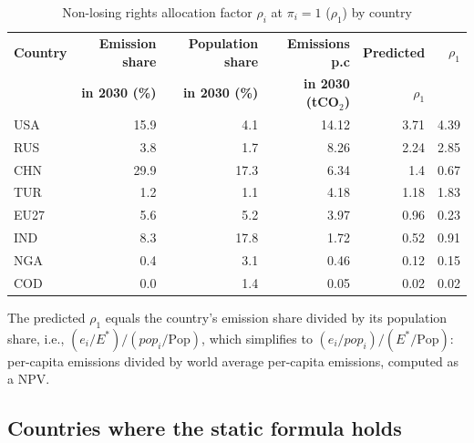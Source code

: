 \documentclass[12pt,english]{article}
\begin{document}
\begin{table}[h]
\centering
\small
\begin{threeparttable}
\caption{Non-losing rights allocation factor $\rho_i$ at $\pi_i = 1$ ($\rho_1$) by country}
\renewcommand{\arraystretch}{1.2}
\begin{tabular}{lrrrrr}
  \toprule
  \textbf{Country} & \textbf{Emission share} & \textbf{Population share} & \textbf{Emissions p.c} & \textbf{Predicted} & $\rho_1$ \\
  & \textbf{in 2030 (\%)} & \textbf{in 2030 (\%)} & \textbf{in 2030 (tCO$_2$)} & \textbf{$\rho_1$}\tnote{a} & \\
  \midrule
  USA & 15.9 & 4.1 & 14.12 & 3.71 & 4.39 \\
  RUS & 3.8 & 1.7 & 8.26 & 2.24 & 2.85 \\
  CHN & 29.9 & 17.3 & 6.34 & 1.4 & 0.67 \\
  TUR & 1.2 & 1.1 & 4.18 & 1.18 & 1.83 \\
  EU27 & 5.6 & 5.2 & 3.97 & 0.96 & 0.23 \\
  IND & 8.3 & 17.8 & 1.72 & 0.52 & 0.91 \\
  NGA & 0.4 & 3.1 & 0.46 & 0.12 & 0.15 \\
  COD & 0.0 & 1.4 & 0.05 & 0.02 & 0.02 \\
  \bottomrule
\end{tabular}
\begin{tablenotes}\footnotesize
  \item[a] The predicted $\rho_1$ equals the country's emission share divided by its population share, i.e., $(e_i/E^*) / (pop_i/\text{Pop})$, which simplifies to $(e_i/pop_i) / (E^*/\text{Pop})$: per-capita emissions divided by world average per-capita emissions, computed as a NPV.
\end{tablenotes}
\label{tab:summary}
\end{threeparttable}
\end{table}

\subsection{Countries where the static formula holds}
\end{document}

